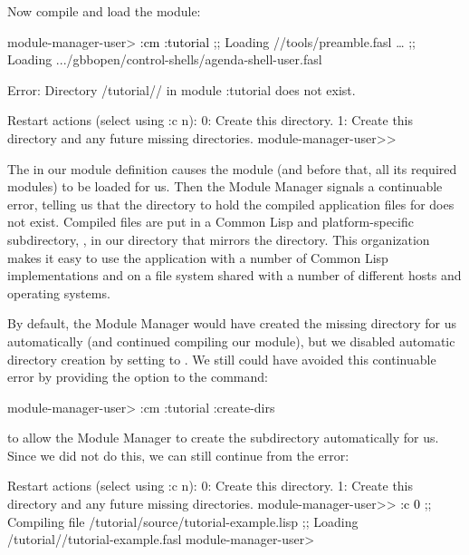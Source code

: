 \documentclass[10pt,twoside,english,pdftex]{article}
\begin{document}
Now compile and load the  module:
%
\W\supp
\begin{example}
\textcolor{darkergray}{%
  module-manager-user> \textcolor{black}{:cm :tutorial}
  ;;   Loading //tools/preamble.fasl
     \textrm{\ldots{}}
  ;;   Loading .../gbbopen/control-shells/agenda-shell-user.fasl

  Error: Directory /tutorial// 
         in module :tutorial does not exist.

  Restart actions (select using :c n):
    0: Create this directory.
    1: Create this directory and any future missing directories.
  module-manager-user>>}
\end{example}
%
The  in our  module definition causes the
 module (and before that, all its required
modules) to be loaded for us. Then the Module Manager signals a continuable
error, telling us that the directory to hold the compiled application files
for  does not exist. Compiled files are put in a Common
Lisp and platform-specific subdirectory, ,
in our  directory that mirrors the  directory.
This organization makes it easy to use the application with a number of Common
Lisp implementations and on a file system shared with a number of different
hosts and operating systems.

By default, the Module Manager would have created the missing
 directory for us
automatically (and continued compiling our  module), but we
disabled automatic directory creation by setting
 to \nil.
We still could have avoided this continuable error by providing the
 option to the  command:
%
\W\supp
\begin{example}
\textcolor{darkergray}{%
  module-manager-user> :cm :tutorial :create-dirs}
\end{example}
%
to allow the Module Manager to create the 
subdirectory automatically for us.  Since we did not do this, we can still
continue from the error:
%
\W\supp\notpretop
\begin{smallexample}
\textcolor{darkergray}{%
  Restart actions (select using :c n):
    0: Create this directory.
    1: Create this directory and any future missing directories.
  module-manager-user>> \textcolor{black}{:c 0}
  ;; Compiling file /tutorial/source/tutorial-example.lisp
  ;; Loading /tutorial//tutorial-example.fasl
  module-manager-user>}
\end{smallexample}
\end{document}
